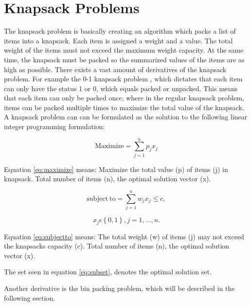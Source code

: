 \section{Knapsack Problems}
\label{sec:knapsack}
The knapsack problem is basically creating an algorithm which packs a list of items into a knapsack. Each item is assigned a weight and a value. The total weight of the items must not exceed the maximum weight capacity. At the same time, the knapsack must be packed so the summarized values of the items are as high as possible. There exists a vast amount of derivatives of the knapsack problem. For example the 0-1 knapsack problem \citep{knapsackproblems}, which dictates that each item can only have the status 1 or 0, which equals packed or unpacked. This means that each item can only be packed once, where in the regular knapsack problem, items can be packed multiple times to maximize the total value of the knapsack. A knapsack problem can can be formulated as the solution to the following linear integer programming formulation:


\begin{equation}
	\label{eq:maximize}
	\mathrm{Maximize} = \displaystyle\sum_{j=1}^{n} p_{j}x_{j}
\end{equation}

Equation \ref{eq:maximize} means: Maximize the total value (p) of items (j) in knapsack. Total number of items (n), the optimal solution vector (x).

\begin{equation}
	\label{eq:subjectto}
	\mathrm{subject~to} = \displaystyle\sum_{j=1}^{n} w_{j}x_{j}\leq c,
\end{equation}


\begin{equation}
	\label{eq:subset}
	x_{j}\displaystyle\epsilon\left\{ 0,1 \right \}, j=1,...,n.
\end{equation}

Equation \ref{eq:subjectto} means: The total weight (w) of items (j) may not exceed the knapsacks capacity (c). Total number of items (n), the optimal solution vector (x).

The set seen in equation \ref{eq:subset}, denotes the optimal solution set. 

\citep{knapsackproblems}
\newline
Another derivative is the bin packing problem, which will be described in the following section.